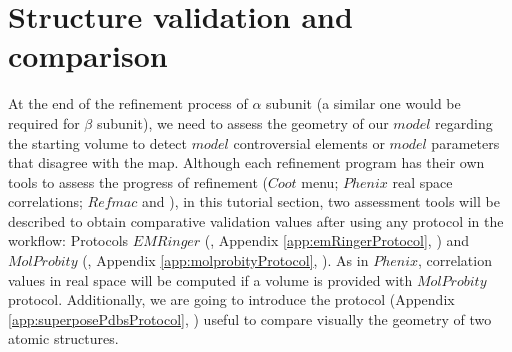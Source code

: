 \section{Structure validation and comparison}

 At the end of the refinement process of  $\alpha$ subunit (a similar one would be required for $\beta$ subunit), we need to assess the geometry of our $model$ regarding the starting 
volume to detect $model$ controversial elements or $model$ parameters that disagree with the map. Although each refinement program has their own tools to assess the progress of refinement ($Coot$  menu; $Phenix$  real space correlations; $Refmac$  and ), in this tutorial section, two assessment tools will be described to obtain comparative validation values after using any protocol in the workflow:  Protocols $EMRinger$ (, Appendix \ref{app:emRingerProtocol}, \citep{barad2015}) and $MolProbity$ (, Appendix \ref{app:molprobityProtocol}, \citep{davis2004}). As in $Phenix$, correlation values in real space will be computed if a volume is provided with $MolProbity$ protocol. Additionally, we are going to introduce the protocol  (Appendix \ref{app:superposePdbsProtocol}, \citep{zwartUrl}) useful to compare visually the geometry of two atomic structures.\\

